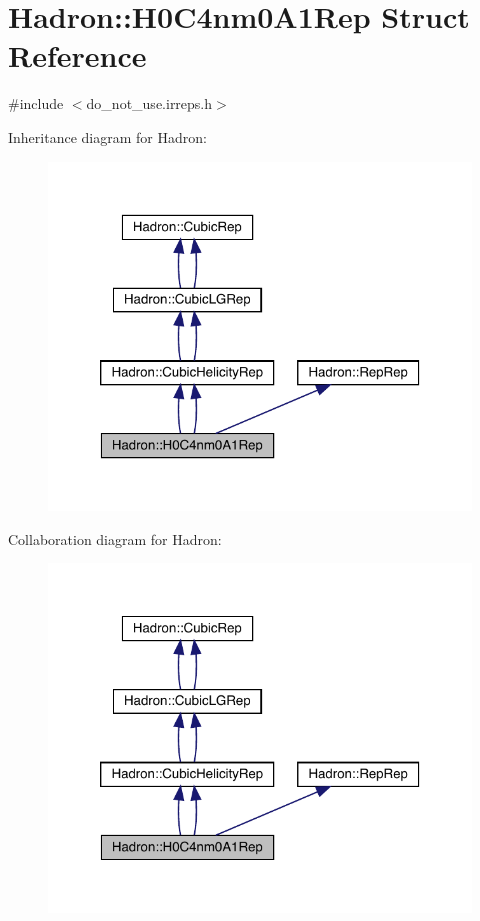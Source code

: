 \hypertarget{structHadron_1_1H0C4nm0A1Rep}{}\section{Hadron\+:\+:H0\+C4nm0\+A1\+Rep Struct Reference}
\label{structHadron_1_1H0C4nm0A1Rep}


{\ttfamily \#include $<$do\+\_\+not\+\_\+use.\+irreps.\+h$>$}



Inheritance diagram for Hadron\+:\nopagebreak
\begin{figure}[H]
\begin{center}
\leavevmode
\includegraphics[width=320pt]{da/db9/structHadron_1_1H0C4nm0A1Rep__inherit__graph}
\end{center}
\end{figure}


Collaboration diagram for Hadron\+:\nopagebreak
\begin{figure}[H]
\begin{center}
\leavevmode
\includegraphics[width=320pt]{dc/d8e/structHadron_1_1H0C4nm0A1Rep__coll__graph}
\end{center}
\end{figure}

